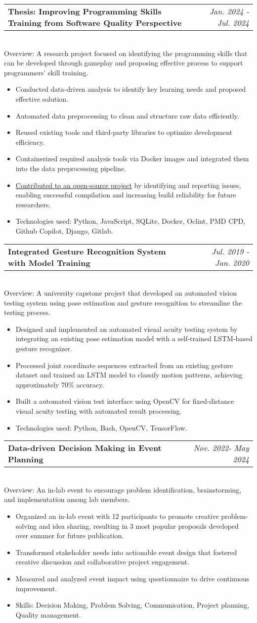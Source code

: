 \documentclass[letterpaper,11pt]{article}
\makeatletter
\newcommand{\jobSubheading}[3]{  
  \vspace{-1pt}\item
    \begin{tabular*}{0.97\textwidth}{l@{\extracolsep{\fill}}r}
      \textbf{#1} & \textit{\small#2} \\  %
    \end{tabular*}
    \\ \small #3  %
  \vspace{-5pt}
}
\newcommand{\jobSubItem}[1]{  
  \item \small #1 \vspace{-4pt}
}
\newcommand{\resumeItemListStart}{\begin{itemize}}
\newcommand{\resumeItemListEnd}{\end{itemize}\vspace{-5pt}}
\makeatother
\begin{document}
\jobSubheading
      {Thesis: Improving Programming Skills Training from Software Quality Perspective}{Jan. 2024 - Jul. 2024}
      {Overview: A research project focused on identifying the programming skills that can be developed through gameplay and proposing effective process to support programmers' skill training.}
      \resumeItemListStart
        \jobSubItem{Conducted data-driven analysis to identify key learning needs and proposed effective solution.}
        \jobSubItem{Automated data preprocessing to clean and structure raw data efficiently.}
        \jobSubItem{Reused existing tools and third-party libraries to optimize development efficiency.}
        \jobSubItem{Containerized required analysis tools via Docker images and integrated them into the data preprocessing pipeline.}
        \jobSubItem{\href{https://github.com/ptidejteam/ptidej-Ptidej/issues?q=is\%3Aissue\%20state\%3Aclosed\%20author\%3Ayihsuan1102}{Contributed to an open-source project} by identifying and reporting issues, enabling successful compilation and increasing build reliability for future researchers.}
        \jobSubItem{Technologies used: Python, JavaScript, SQLite, Docker, Oclint, PMD CPD, Github Copilot, Django, Gitlab.}
      \resumeItemListEnd


      \jobSubheading
  {Integrated Gesture Recognition System with Model Training}{Jul. 2019 - Jan. 2020}
  {Overview: A university capstone project that developed an automated vision testing system using pose estimation and gesture recognition to streamline the testing process.}
  \resumeItemListStart
    \jobSubItem{Designed and implemented an automated visual acuity testing system by integrating an existing pose estimation model with a self-trained LSTM-based gesture recognizer.}
    \jobSubItem{Processed joint coordinate sequences extracted from an existing gesture dataset and trained an LSTM model to classify motion patterns, achieving approximately 70\% accuracy.}
    \jobSubItem{Built a automated vision test interface using OpenCV for fixed-distance visual acuity testing with automated result processing.}
    \jobSubItem{Technologies used: Python, Bash, OpenCV, TensorFlow.}
  \resumeItemListEnd
    

\jobSubheading
      {Data-driven Decision Making in Event Planning}{Nov. 2022- May 2024}
      {Overview: An in-lab event to encourage problem identification, brainstorming, and implementation among lab members.}
      \resumeItemListStart
        \jobSubItem{Organized an in-lab event with 12 participants to promote creative problem-solving and idea sharing, resulting in 3 most popular proposals developed over summer for future publication.}
        \jobSubItem{Transformed stakeholder needs into actionable event design that fostered creative discussion and collaborative project engagement.}
        \jobSubItem{Measured and analyzed event impact using questionnaire to drive continuous improvement.}
        \jobSubItem{Skills: Decision Making, Problem Solving, Communication, Project planning, Quality management.}
      \resumeItemListEnd
\end{document}
